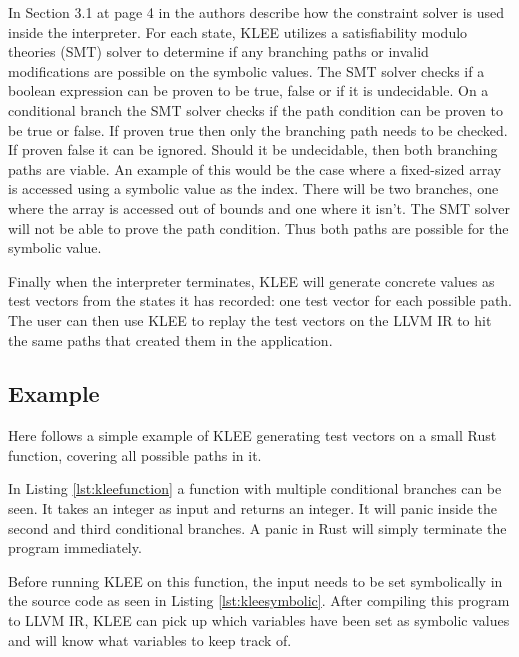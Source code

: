 In Section 3.1 at page 4 in \cite{kleepaper} the authors describe how the
constraint solver is used inside the interpreter. For each state, KLEE utilizes
a satisfiability modulo theories (SMT) solver to determine if any branching
paths or invalid modifications are possible on the symbolic values. The SMT
solver checks if a boolean expression can be proven to be true, false or if it
is undecidable. On a conditional branch the SMT solver checks if the path
condition can be proven to be true or false. If proven true then only the
branching path needs to be checked. If proven false it can be ignored. Should
it be undecidable, then both branching paths are viable. An example of this
would be the case where a fixed-sized array is accessed using a symbolic value
as the index. There will be two branches, one where the array is accessed out
of bounds and one where it isn't. The SMT solver will not be able to prove the
path condition. Thus both paths are possible for the symbolic value.

Finally when the interpreter terminates, KLEE will generate concrete values as
test vectors from the states it has recorded: one test vector for each possible
path. The user can then use KLEE to replay the test vectors on the LLVM IR to hit
the same paths that created them in the application.

\subsection{Example}
Here follows a simple example of KLEE generating test vectors on a small Rust
function, covering all possible paths in it.

In Listing \ref{lst:kleefunction} a function with multiple conditional branches
can be seen. It takes an integer as input and returns an integer.  It will
panic inside the second and third conditional branches. A panic in Rust will
simply terminate the program immediately.


Before running KLEE on this function, the input needs to be set symbolically in
the source code as seen in Listing \ref{lst:kleesymbolic}. After compiling this
program to LLVM IR, KLEE can pick up which variables have been set as symbolic
values and will know what variables to keep track of.


